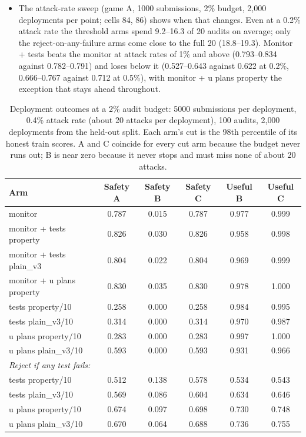 \begin{itemize}
        safety for every arm that uses a 2\% cut. Only B, which runs the full
        horizon, uses every audit.
  \item The attack-rate sweep (game A, 1000 submissions, 2\% budget, 2{,}000
        deployments per point; cells 84, 86) shows when that changes. Even at a
        0.2\% attack rate the threshold arms spend 9.2--16.3 of 20 audits on
        average; only the reject-on-any-failure arms come close to the full 20
        (18.8--19.3). Monitor + tests beats the monitor at attack rates of 1\%
        and above (0.793--0.834 against 0.782--0.791) and loses below it
        (0.527--0.643 against 0.622 at 0.2\%, 0.666--0.767 against 0.712 at
        0.5\%), with monitor + u plans property the exception that stays ahead
        throughout.
\end{itemize}

\begin{table}[t]
\centering
\small
\begin{tabular}{lccccc}
\hline
Arm & Safety A & Safety B & Safety C & Useful B & Useful C \\
\hline
monitor                    & 0.787 & 0.015 & 0.787 & 0.977 & 0.999 \\
monitor + tests property   & 0.826 & 0.030 & 0.826 & 0.958 & 0.998 \\
monitor + tests plain\_v3  & 0.804 & 0.022 & 0.804 & 0.969 & 0.999 \\
monitor + u plans property & 0.830 & 0.035 & 0.830 & 0.978 & 1.000 \\
tests property/10          & 0.258 & 0.000 & 0.258 & 0.984 & 0.995 \\
tests plain\_v3/10         & 0.314 & 0.000 & 0.314 & 0.970 & 0.987 \\
u plans property/10        & 0.283 & 0.000 & 0.283 & 0.997 & 1.000 \\
u plans plain\_v3/10       & 0.593 & 0.000 & 0.593 & 0.931 & 0.966 \\
\hline
\multicolumn{6}{l}{\textit{Reject if any test fails:}} \\
tests property/10          & 0.512 & 0.138 & 0.578 & 0.534 & 0.543 \\
tests plain\_v3/10         & 0.569 & 0.086 & 0.604 & 0.634 & 0.646 \\
u plans property/10        & 0.674 & 0.097 & 0.698 & 0.730 & 0.748 \\
u plans plain\_v3/10       & 0.670 & 0.064 & 0.688 & 0.736 & 0.755 \\
\hline
\end{tabular}
\caption{Deployment outcomes at a 2\% audit budget: 5000 submissions per
deployment, 0.4\% attack rate (about 20 attacks per deployment), 100 audits,
2{,}000 deployments from the held-out split. Each arm's cut is the 98th
percentile of its honest train scores. A and C coincide for every cut arm
because the budget never runs out; B is near zero because it never stops and
must miss none of about 20 attacks.}
\label{tab:paper-setting}
\end{table}

